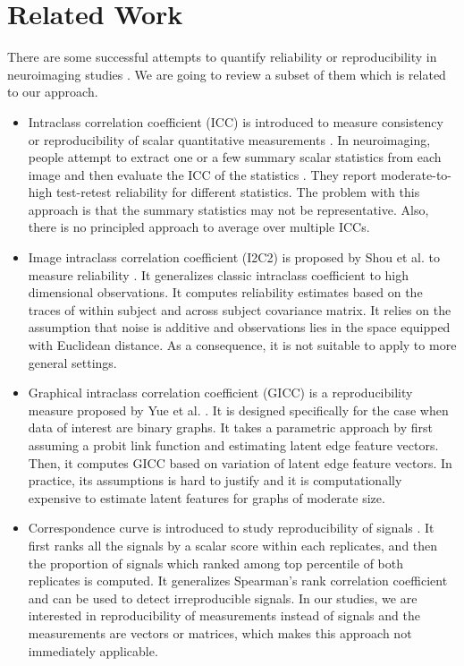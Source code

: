 \documentclass{article}
\begin{document}
\section{Related Work}
There are some successful attempts to quantify reliability or reproducibility in neuroimaging studies \cite{shrout1979intraclass,strother2002quantitative,rizzo2010disco,zuo2010reliable,braun2012test,shou2013quantifying,yue2015estimating,yu2013stability,li2011measuring}. We are going to review a subset of them which is related to our approach.
\begin{itemize}
	\item Intraclass correlation coefficient (ICC) is introduced to measure consistency or reproducibility of scalar quantitative measurements \cite{shrout1979intraclass}. In neuroimaging, people attempt to extract one or a few summary scalar statistics from each image and then evaluate the ICC of the statistics \cite{zuo2010reliable,braun2012test}. They report moderate-to-high test-retest reliability for different statistics. The problem with this approach is that the summary statistics may not be representative. Also, there is no principled approach to average over multiple ICCs. 
	\item Image intraclass correlation coefficient (I2C2) is proposed by Shou et al. to measure reliability  \cite{shou2013quantifying}. It generalizes classic intraclass coefficient to high dimensional observations. It computes reliability estimates based on the traces of within subject and across subject covariance matrix. It relies on the assumption that noise is additive and observations lies in the space equipped with Euclidean distance. As a consequence, it is not suitable to apply to more general settings. 
	\item Graphical intraclass correlation coefficient (GICC) is a reproducibility measure proposed by Yue et al. \cite{yue2015estimating}. It is designed specifically for the case when data of interest are binary graphs. It takes a parametric approach by first assuming a probit link function and estimating latent edge feature vectors. Then, it computes GICC based on variation of latent edge feature vectors. In practice, its assumptions is hard to justify and it is computationally expensive to estimate latent features for graphs of moderate size. 
	\item Correspondence curve is introduced to study reproducibility of signals \cite{li2011measuring}. It first ranks all the signals by a scalar score within each replicates, and then the proportion of signals which ranked among top percentile of both replicates is computed. It generalizes Spearman's rank correlation coefficient and can be used to detect irreproducible signals. In our studies, we are interested in reproducibility of measurements instead of signals and the measurements are vectors or matrices, which makes this approach not immediately applicable.

\end{itemize}
\end{document}
